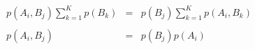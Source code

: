 \begin{equation}
	\begin{array}{lll}
		p(A_i,B_j)\sum_{k=1}^K p(B_k) & = & p(B_j)\sum_{k=1}^K p(A_i,B_k) \\
		                              &   &                               \\
		p(A_i,B_j)                    & = & p(B_j)p(A_i)
	\end{array}
\end{equation}
